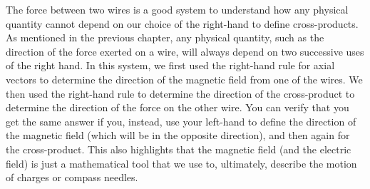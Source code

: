 The force between two wires is a good system to understand how any physical quantity cannot depend on our choice of the right-hand to define cross-products. As mentioned in the previous chapter, any physical quantity, such as the direction of the force exerted on a wire, will always depend on two successive uses of the right hand. In this system, we first used the right-hand rule for axial vectors to determine the direction of the magnetic field from one of the wires. We then used the right-hand rule to determine the direction of the cross-product to determine the direction of the force on the other wire. You can verify that you get the same answer if you, instead, use your left-hand to define the direction of the magnetic field (which will be in the opposite direction), and then again for the cross-product. This also highlights that the magnetic field (and the electric field) is just a mathematical tool that we use to, ultimately, describe the motion of charges or compass needles.

